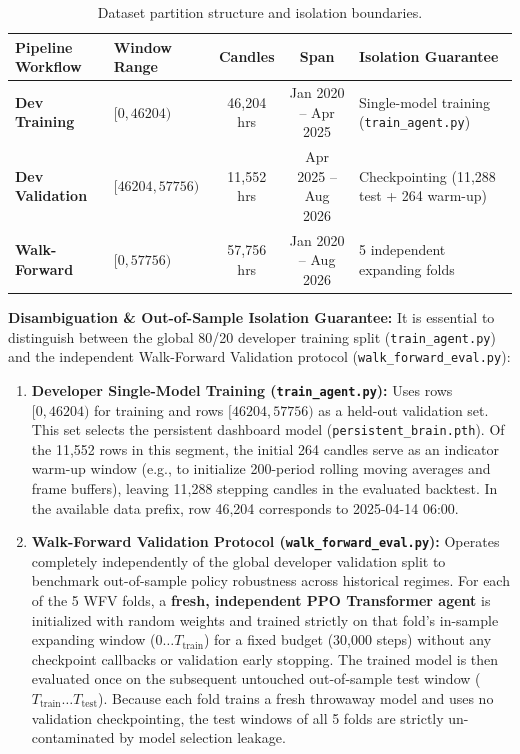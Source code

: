 \documentclass[11pt,a4paper]{article}
\begin{document}
\begin{table}[H]
\centering
\footnotesize
\begin{tabularx}{\textwidth}{p{2.8cm} p{3.2cm} c c X}
\toprule
\textbf{Pipeline Workflow} & \textbf{Window Range} & \textbf{Candles} & \textbf{Span} & \textbf{Isolation Guarantee} \\
\midrule
\textbf{Dev Training} & $[0, 46204)$ & 46,204 hrs & Jan 2020 -- Apr 2025 & Single-model training (\texttt{train\_agent.py}) \\
\textbf{Dev Validation} & $[46204, 57756)$ & 11,552 hrs & Apr 2025 -- Aug 2026 & Checkpointing (11,288 test + 264 warm-up) \\
\textbf{Walk-Forward} & $[0, 57756)$ & 57,756 hrs & Jan 2020 -- Aug 2026 & 5 independent expanding folds \\
\bottomrule
\end{tabularx}
\caption{Dataset partition structure and isolation boundaries.}
\label{tab:dataset_splits}
\end{table}

\textbf{Disambiguation \& Out-of-Sample Isolation Guarantee:} It is essential to distinguish between the global 80/20 developer training split (\texttt{train\_agent.py}) and the independent Walk-Forward Validation protocol (\texttt{walk\_forward\_eval.py}):
\begin{enumerate}[leftmargin=2em]
    \item \textbf{Developer Single-Model Training (\texttt{train\_agent.py}):} Uses rows $[0,46204)$ for training and rows $[46204,57756)$ as a held-out validation set. This set selects the persistent dashboard model (\texttt{persistent\_brain.pth}). Of the 11,552 rows in this segment, the initial 264 candles serve as an indicator warm-up window (e.g., to initialize 200-period rolling moving averages and frame buffers), leaving 11,288 stepping candles in the evaluated backtest. In the available data prefix, row 46,204 corresponds to 2025-04-14 06:00.
    \item \textbf{Walk-Forward Validation Protocol (\texttt{walk\_forward\_eval.py}):} Operates completely independently of the global developer validation split to benchmark out-of-sample policy robustness across historical regimes. For each of the 5 WFV folds, a \textbf{fresh, independent PPO Transformer agent} is initialized with random weights and trained strictly on that fold's in-sample expanding window ($0 \dots T_{\text{train}}$) for a fixed budget (30,000 steps) without any checkpoint callbacks or validation early stopping. The trained model is then evaluated once on the subsequent untouched out-of-sample test window ($T_{\text{train}} \dots T_{\text{test}}$). Because each fold trains a fresh throwaway model and uses no validation checkpointing, the test windows of all 5 folds are strictly un-contaminated by model selection leakage.
\end{enumerate}
\end{document}
